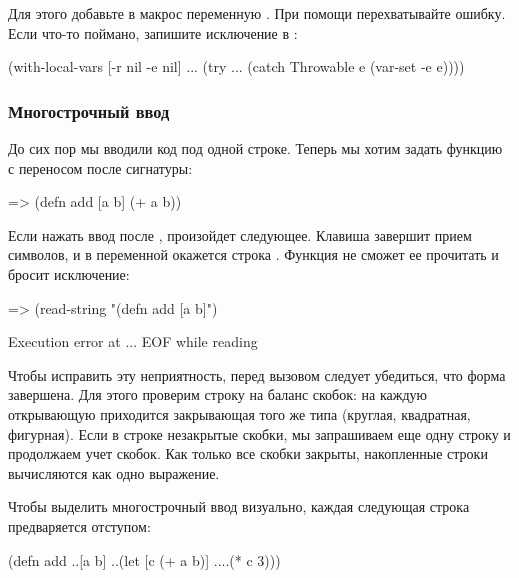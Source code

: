 Для этого добавьте в макрос  переменную \code{[-e nil]}. При помощи  перехватывайте ошибку. Если что-то поймано, запишите исключение в :

\begin{english}
  \begin{clojure}
(with-local-vars [-r nil -e nil]
  ...
  (try
    ...
    (catch Throwable e
      (var-set -e e))))
  \end{clojure}
\end{english}

\subsubsection{Многострочный ввод}

До сих пор мы вводили код под одной строке. Теперь мы хотим задать функцию с переносом после сигнатуры:

\begin{english}
  \begin{clojure}
=> (defn add [a b]
    (+ a b))
  \end{clojure}
\end{english}

Если нажать ввод после \code{b]}, произойдет следующее. Клавиша \enter завершит прием символов, и в переменной окажется строка . Функция  не сможет ее прочитать и бросит исключение:

\begin{english}
  \begin{clojure}
=> (read-string "(defn add [a b]")

Execution error at ...
EOF while reading
  \end{clojure}
\end{english}

Чтобы исправить эту неприятность, перед вызовом  следует убедиться, что форма завершена. Для этого проверим строку на баланс скобок: на каждую открывающую приходится закрывающая того же типа (круглая, квадратная, фигурная). Если в строке незакрытые скобки, мы запрашиваем еще одну строку и продолжаем учет скобок. Как только все скобки закрыты, накопленные строки вычисляются как одно выражение.

Чтобы выделить многострочный ввод визуально, каждая следующая строка предваряется отступом:

\begin{english}
  \begin{clojure}
(defn add
..[a b]
..(let [c (+ a b)]
....(* c 3)))
  \end{clojure}
\end{english}

